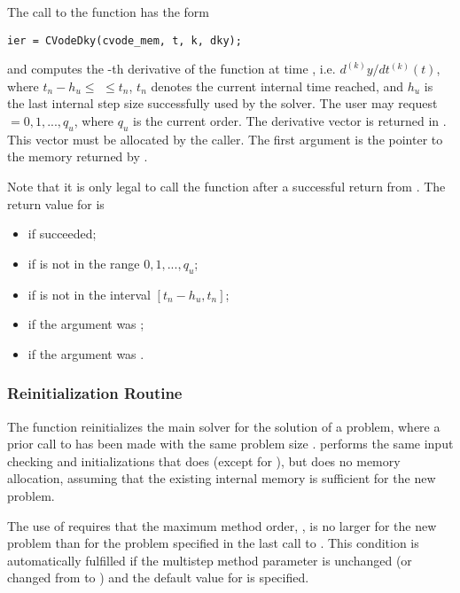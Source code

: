 The call to the  function has the form
\begin{verbatim}
ier = CVodeDky(cvode_mem, t, k, dky);
\end{verbatim}
and computes the -th derivative of the  function at      
time , i.e. $d^{(k)}y/dt^{(k)} (t)$, where $t_n - h_u \le$  $\le t_n$, 
$t_n$ denotes the current internal time reached, and $h_u$ is the 
last internal step size successfully used by the solver. 
The user may request  $= 0, 1, ..., q_u$, where $q_u$ is the 
current order. The derivative vector is returned in . 
This vector must be allocated by the caller. 
The first argument  is the pointer to the {\cvodes}
memory returned by .

Note that it is only legal to call the function  after a 
successful return from .
The return value  for  is
\begin{itemize}
\item {} if  succeeded;
\item {} if  is not in the range $0, 1, ..., q_u$;
\item {} if  is not in the interval $[t_n - h_u , t_n]$;
\item {} if the  argument was ;
\item {} if the  argument was .
\end{itemize}

\subsubsection{{\cvodes} Reinitialization Routine}\label{sss:cvreinit}

The function  reinitializes the main {\cvodes} solver for
the solution of a problem, where a prior call to  has
been made with the same problem size .  performs the 
same input checking and initializations that  does 
(except for ), but does no memory allocation, assuming that the 
existing internal memory is sufficient for the new problem.             
                                                                 
The use of  requires that the maximum method order,    
, is no larger for the new problem than for the problem  
specified in the last call to .  This condition is  
automatically fulfilled if the multistep method parameter   
is unchanged (or changed from  to ) and the default    
value for  is specified.                                 
                                                                 
